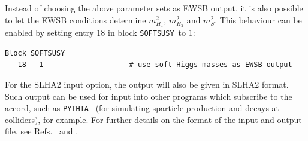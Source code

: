 \documentclass[final,3p,times]{elsarticle}
\def\SOFTSUSY{{\tt SOFTSUSY}}
\def\code#1{\small{\tt #1}\normalsize}
\begin{document}
Instead of choosing the above parameter sets as EWSB output, it is also
possible to let the EWSB conditions determine $m_{H_1}^2$, $m_{H_2}^2$
and $m_S^2$.  This behaviour can be enabled by setting entry $18$ in
block \SOFTSUSY\ to $1$:
%
\begin{verbatim}
Block SOFTSUSY
   18   1                    # use soft Higgs masses as EWSB output
\end{verbatim}

For the SLHA2 input option, 
the output will also be given in 
SLHA2 format. Such output can be used for
input into other programs which subscribe to the accord, such as
\code{PYTHIA}~\cite{Sjostrand:2007gs} (for
simulating sparticle production and decays at colliders), for example. For
further details on the format of 
the input and output file, see Refs.~\cite{Allanach:2008qq} and \cite{Skands:2003cj}.
\end{document}
